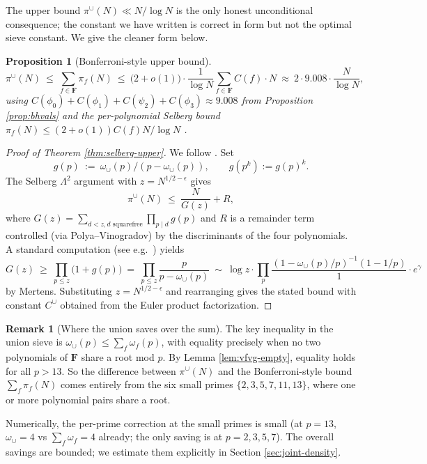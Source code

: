 \documentclass[11pt]{article}
\newtheorem{proposition}[theorem]{Proposition}
\theoremstyle{definition}
\newtheorem{remark}[theorem]{Remark}
\newcommand{\F}{\mathbf{F}}
\newcommand{\F}{\mathcal{F}}
\begin{document}
The upper bound $\pi^\cup(N) \ll N/\log N$ is the only honest unconditional consequence; the constant we have written is correct in form but not the optimal sieve constant. We give the cleaner form below.

\begin{proposition}[Bonferroni-style upper bound]\label{prop:bonferroni}
\[
\pi^\cup(N)\ \le\ \sum_{f\in\F}\pi_f(N)\ \le\ \bigl(2+o(1)\bigr)\cdot\frac{1}{\log N}\sum_{f\in\F} C(f)\cdot N\ \approx\ 2\cdot 9.008\cdot\frac{N}{\log N},
\]
using $C(\phi_0)+C(\phi_1)+C(\psi_2)+C(\phi_3)\approx 9.008$ from Proposition \ref{prop:bhvals} and the per-polynomial Selberg bound $\pi_f(N)\le(2+o(1))C(f)N/\log N$ \cite[Theorem 5.3]{halberstamrichert}.
\end{proposition}

\begin{proof}[Proof of Theorem \ref{thm:selberg-upper}]
We follow \cite[Ch.\ 3]{halberstamrichert}. Set
\[
g(p)\ :=\ \omega_\cup(p)/(p-\omega_\cup(p)),\qquad g(p^k):=g(p)^k.
\]
The Selberg $\Lambda^2$ argument with $z=N^{1/2-\epsilon}$ gives
\[
\pi^\cup(N)\ \le\ \frac{N}{G(z)}+R,
\]
where $G(z)=\sum_{d<z, d\text{ squarefree}}\prod_{p\mid d}g(p)$ and $R$ is a remainder term controlled (via Polya--Vinogradov) by the discriminants of the four polynomials. A standard computation (see e.g.\ \cite[Lemma 5.3]{halberstamrichert}) yields
\[
G(z)\ \ge\ \prod_{p\le z}\bigl(1+g(p)\bigr)\ =\ \prod_{p\le z}\frac{p}{p-\omega_\cup(p)}\ \sim\ \log z\cdot\prod_p\frac{(1-\omega_\cup(p)/p)^{-1}(1-1/p)}{1}\cdot e^{\gamma}
\]
by Mertens. Substituting $z=N^{1/2-\epsilon}$ and rearranging gives the stated bound with constant $C^\cup$ obtained from the Euler product factorization.
\end{proof}

\begin{remark}[Where the union saves over the sum]
The key inequality in the union sieve is $\omega_\cup(p)\le \sum_f \omega_f(p)$, with equality precisely when no two polynomials of $\F$ share a root mod $p$. By Lemma \ref{lem:vfvg-empty}, equality holds for all $p>13$. So the difference between $\pi^\cup(N)$ and the Bonferroni-style bound $\sum_f\pi_f(N)$ comes entirely from the six small primes $\{2,3,5,7,11,13\}$, where one or more polynomial pairs share a root.

Numerically, the per-prime correction at the small primes is small (at $p=13$, $\omega_\cup=4$ vs $\sum_f\omega_f=4$ already; the only saving is at $p=2,3,5,7$). The overall savings are bounded; we estimate them explicitly in Section \ref{sec:joint-density}.
\end{remark}
\end{document}
